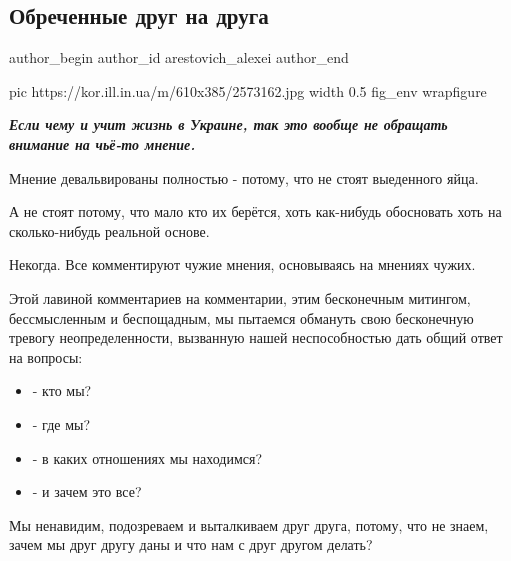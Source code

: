  
 
 
 
 
 
\subsection{Обреченные друг на друга}
\label{sec:15_12_2020.news.ua.korrespondent.arestovich_alexei.1.obrechennyje_drug_na_druga}
\ifcmt
	author_begin
   author_id arestovich_alexei
	author_end
\fi

\ifcmt
  pic https://kor.ill.in.ua/m/610x385/2573162.jpg
  width 0.5
  fig_env wrapfigure
\fi

\begin{leftbar}
	\begingroup
		\em\large\bfseries
Если чему и учит жизнь в Украине, так это вообще не обращать внимание на чьё-то
				мнение.
	\endgroup
\end{leftbar}

Мнение девальвированы полностью - потому, что не стоят выеденного яйца.

А не стоят потому, что мало кто их берётся, хоть как-нибудь обосновать хоть на
сколько-нибудь реальной основе.

Некогда. Все комментируют чужие мнения, основываясь на мнениях чужих.

Этой лавиной комментариев на комментарии, этим бесконечным митингом,
бессмысленным и беспощадным, мы пытаемся обмануть свою бесконечную тревогу
неопределенности, вызванную нашей неспособностью дать общий ответ на вопросы:

\begin{itemize}
  \item - кто мы?
  \item - где мы?
  \item - в каких отношениях мы находимся?
  \item - и зачем это все?
\end{itemize}

Мы ненавидим, подозреваем и выталкиваем друг друга, потому, что не знаем, зачем
мы друг другу даны и что нам с друг другом делать?

